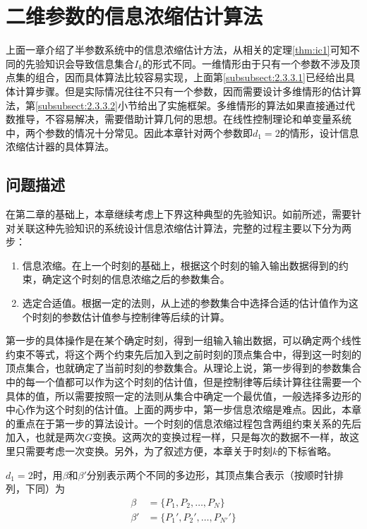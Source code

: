 \chapter{二维参数的信息浓缩估计算法}\label{chap:3}
上面一章介绍了半参数系统中的信息浓缩估计方法，从相关的定理\ref{thm:ic1}可知不同的先验知识会导致信息集合$I_{k}$的形式不同。一维情形由于只有一个参数不涉及顶点集的组合，因而具体算法比较容易实现，上面第\ref{subsubsect:2.3.3.1}已经给出具体计算步骤。但是实际情况往往不只有一个参数，因而需要设计多维情形的估计算法，第\ref{subsubsect:2.3.3.2}小节给出了实施框架。多维情形的算法如果直接通过代数推导，不容易解决，需要借助计算几何的思想。在线性控制理论和单变量系统中，两个参数的情况十分常见。因此本章针对两个参数即$d_{1}=2$的情形，设计信息浓缩估计器的具体算法。
\section{问题描述}\label{sect:3.1}
在第二章的基础上，本章继续考虑上下界这种典型的先验知识。如前所述，需要针对关联这种先验知识的系统设计信息浓缩估计算法，完整的过程主要以下分为两步：
\begin{enumerate}
\item 信息浓缩。在上一个时刻的基础上，根据这个时刻的输入输出数据得到的约束，确定这个时刻的信息浓缩之后的参数集合。
\item 选定合适值。根据一定的法则，从上述的参数集合中选择合适的估计值作为这个时刻的参数估计值参与控制律等后续的计算。
\end{enumerate}

第一步的具体操作是在某个确定时刻，得到一组输入输出数据，可以确定两个线性约束不等式，将这个两个约束先后加入到之前时刻的顶点集合中，得到这一时刻的顶点集合，也就确定了当前时刻的参数集合。从理论上说，第一步得到的参数集合中的每一个值都可以作为这个时刻的估计值，但是控制律等后续计算往往需要一个具体的值，所以需要按照一定的法则从集合中确定一个最优值，一般选择多边形的中心作为这个时刻的估计值。上面的两步中，第一步信息浓缩是难点。因此，本章的重点在于第一步的算法设计。一个时刻的信息浓缩过程包含两组约束关系的先后加入，也就是两次$G$变换。这两次的变换过程一样，只是每次的数据不一样，故这里只需要考虑一次变换。另外，为了叙述方便，本章关于时刻$k$的下标省略。

$d_{1}=2$时，用$\beta$和$\beta'$分别表示两个不同的多边形，其顶点集合表示（按顺时针排列，下同）为
\begin{equation*}%
\begin{split}%
\beta&=\{P_{1},P_{2},\ldots,P_{N}\}\\
\beta'&=\{P_{1}',P_{2}',\ldots,P_{N'}'\}
\end{split}
\end{equation*}

